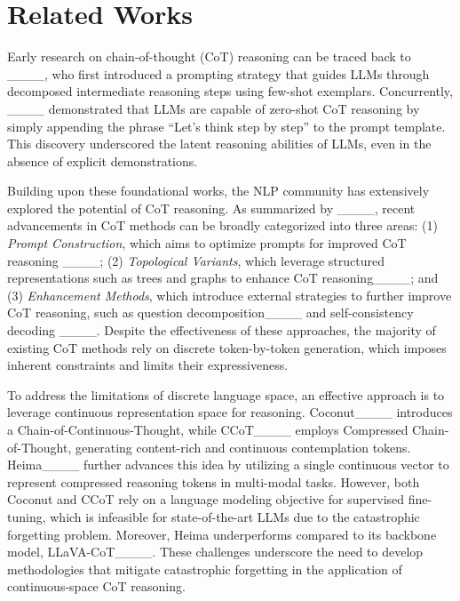 \section{Related Works}
Early research on chain-of-thought (CoT) reasoning can be traced back to ____, who first introduced a prompting strategy that guides LLMs through decomposed intermediate reasoning steps using few-shot exemplars. Concurrently, ____ demonstrated that LLMs are capable of zero-shot CoT reasoning by simply appending the phrase ``Let's think step by step'' to the prompt template. This discovery underscored the latent reasoning abilities of LLMs, even in the absence of explicit demonstrations.

Building upon these foundational works, the NLP community has extensively explored the potential of CoT reasoning. As summarized by ____, recent advancements in CoT methods can be broadly categorized into three areas: (1) {\it Prompt Construction}, which aims to optimize prompts for improved CoT reasoning ____; (2) {\it Topological Variants}, which leverage structured representations such as trees and graphs to enhance CoT reasoning____; and (3) {\it Enhancement Methods}, which introduce external strategies to further improve CoT reasoning, such as question decomposition____ and self-consistency decoding ____. Despite the effectiveness of these approaches, the majority of existing CoT methods rely on discrete token-by-token generation, which imposes inherent constraints and limits their expressiveness.

To address the limitations of discrete language space, an effective approach is to leverage continuous representation space for reasoning. Coconut____ introduces a Chain-of-Continuous-Thought, while CCoT____ employs Compressed Chain-of-Thought, generating content-rich and continuous contemplation tokens. Heima____ further advances this idea by utilizing a single continuous vector to represent compressed reasoning tokens in multi-modal tasks. However, both Coconut and CCoT rely on a language modeling objective for supervised fine-tuning, which is infeasible for state-of-the-art LLMs due to the catastrophic forgetting problem. Moreover, Heima underperforms compared to its backbone model, LLaVA-CoT____. These challenges underscore the need to develop methodologies that mitigate catastrophic forgetting in the application of continuous-space CoT reasoning.